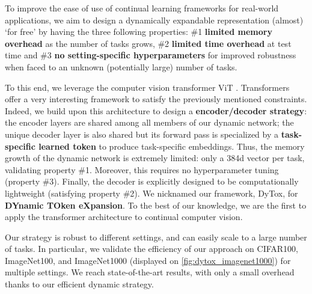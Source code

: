 To improve the ease of use of continual learning frameworks for real-world applications, we aim to
design a dynamically expandable representation (almost) `for free' by having the three following
properties: \#1 \textbf{limited memory overhead} as the number of tasks grows, \#2 \textbf{limited
    time overhead} at test time and \#3 \textbf{no setting-specific hyperparameters} for improved
robustness when faced to an unknown (potentially large) number of tasks.

To this end, we leverage the computer vision transformer ViT \cite{dosovitskiy2020vit}. Transformers
\cite{vaswani2017transformer} offer a very interesting framework to satisfy the previously
mentioned constraints. Indeed, we build upon this architecture to design a \textbf{encoder/decoder
    strategy}: the encoder layers are shared among all members of our dynamic network; the unique
decoder layer is also shared but its forward pass is specialized by a \textbf{task-specific learned
    token} to produce task-specific embeddings. Thus, the memory growth of the dynamic network is
extremely limited: only a 384d vector per task, validating property \#1. Moreover, this requires no
hyperparameter tuning (property \#3). Finally, the decoder is explicitly designed to be
computationally lightweight (satisfying property \#2). We nicknamed our framework, DyTox, for
\textbf{DYnamic TOken eXpansion}. To the best of our knowledge, we are the first to apply the
transformer architecture to continual computer vision.

Our strategy is robust to different settings, and can easily scale to a large number of tasks. In
particular, we validate the efficiency of our approach on CIFAR100, ImageNet100, and ImageNet1000
(displayed on \autoref{fig:dytox_imagenet1000}) for multiple settings. We reach state-of-the-art results,
with only a small overhead thanks to our efficient dynamic strategy.

